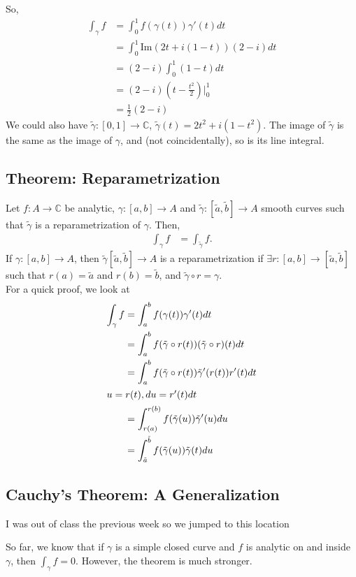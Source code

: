 \documentclass[10pt]{extarticle}
\newcommand{\C}{\mathbb{C}}
\begin{document}
  So,
  \begin{align*}
    \int_{\gamma}f &= \int_{0}^{1}f(\gamma(t))\gamma'(t)dt\\
                   &= \int_{0}^{1}\text{Im}(2t + i(1-t))(2-i)dt\\
                   &= (2-i)\int_{0}^{1}(1-t)dt\\
                   &= (2-i)\left(t-\frac{t^2}{2}\right)\biggr\vert_{0}^{1}\\
                   &= \frac{1}{2}\left(2-i\right)
  \end{align*}
  We could also have $\tilde{\gamma}:[0,1]\rightarrow \C$, $\tilde{\gamma}(t) = 2t^2 + i(1-t^2)$. The image of $\tilde{\gamma}$ is the same as the image of $\gamma$, and (not coincidentally), so is its line integral.
  \subsection{Theorem: Reparametrization}%
  Let $f: A\rightarrow \C$ be analytic, $\gamma: [a,b]\rightarrow A$ and $\tilde{\gamma}:[\tilde{a},\tilde{b}]\rightarrow A$ smooth curves such that $\tilde{\gamma}$ is a reparametrization of $\gamma$. Then, 
  \begin{align*}
    \int_{\gamma}f &= \int_{\tilde{\gamma}}f.
  \end{align*}
  If $\gamma: [a,b]\rightarrow A$, then $\tilde{\gamma}[\tilde{a},\tilde{b}]\rightarrow A$ is a reparametrization if $\exists r: [a,b]\rightarrow [\tilde{a},\tilde{b}]$ such that $r(a) = \tilde{a}$ and $r(b) = \tilde{b}$, and $\tilde{\gamma}\circ r = \gamma$.\\

  For a quick proof, we look at
  \begin{align*}
    \int_{\gamma}f &= \int_{a}^{b}f(\gamma(t))\gamma'(t)dt\\
                   &= \int_{a}^{b}f(\tilde{\gamma}\circ r(t))(\tilde{\gamma}\circ r)(t)dt\\
                   &= \int_{a}^{b}f(\tilde{\gamma}\circ r(t))\tilde{\gamma}'(r(t))r'(t)dt\\
                   \intertext{$u = r(t), du = r'(t)dt$}
                   &= \int_{r(a)}^{r(b)}f(\tilde{\gamma}(u))\tilde{\gamma}'(u)du\\
                   &= \int_{\tilde{a}}^{\tilde{b}}f(\tilde{\gamma}(u))\tilde{\gamma}(t)du
  \end{align*}
  \subsection{Cauchy's Theorem: A Generalization}%
  \begin{description}
    \tiny
    \item[Note:]I was out of class the previous week so we jumped to this location
  \end{description}
  So far, we know that if $\gamma$ is a simple closed curve and $f$ is analytic on and inside $\gamma$, then $\int_{\gamma}f = 0$. However, the theorem is much stronger.\\
\end{document}
